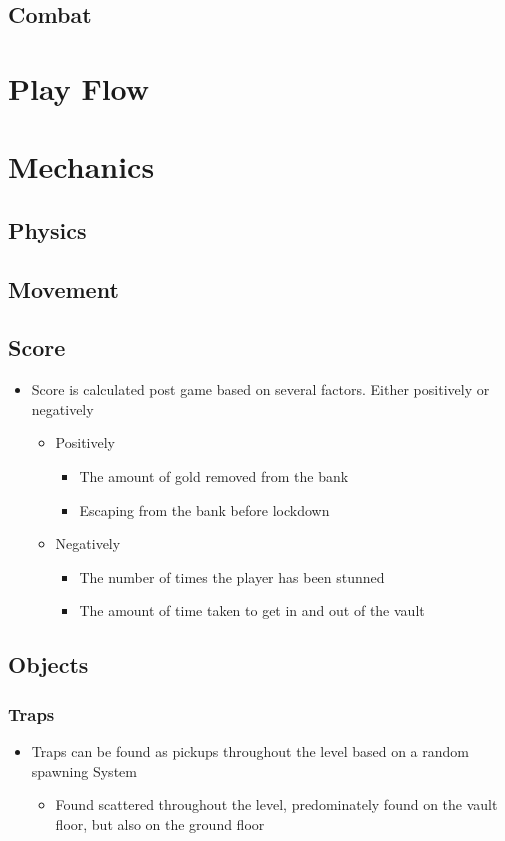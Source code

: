 \documentclass[14pt]{report}
\begin{document}
\subsection{Combat}


\section{Play Flow}

\section{Mechanics}
\subsection{Physics}
\subsection{Movement}
\subsection{Score}
\begin{itemize}
    \item Score is calculated post game based on several factors. Either positively or negatively
    \begin{itemize}
        \item Positively
        \begin{itemize}
            \item The amount of gold removed from the bank
            \item Escaping from the bank before lockdown
        \end{itemize}
        \item Negatively
        \begin{itemize}
            \item The number of times the player has been stunned
            \item The amount of time taken to get in and out of the vault
        \end{itemize}
    \end{itemize}
\end{itemize}
\subsection{Objects}
\subsubsection{Traps}
\begin{itemize}
    \item Traps can be found as pickups throughout the level based on a random spawning System
    \begin{itemize}
        \item Found scattered throughout the level, predominately found on the vault floor, but also on the ground floor
    \end{itemize}
\end{itemize}
\end{document}
